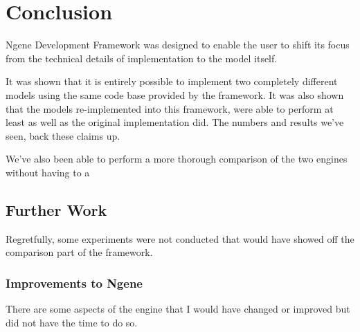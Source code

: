 \section{Conclusion}
Ngene Development Framework was designed to enable the user to shift its focus from the technical details of implementation to the model itself.

It was shown that it is entirely possible to implement two completely different models using the same code base provided by the framework. It was also shown that the models re-implemented into this framework, were able to perform at least as well as the original implementation did. The numbers and results we've seen, back these claims up.

We've also been able to perform a more thorough comparison of the two engines without having to a


\subsection{Further Work}

Regretfully, some experiments were not conducted that would have showed off the comparison part of the framework.

\subsubsection{Improvements to Ngene}
\label{sec:improvements}
There are some aspects of the engine that I would have changed or improved but did not have the time to do so.

